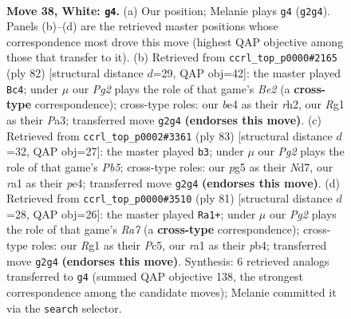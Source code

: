 \documentclass[11pt]{article}
\begin{document}
\clearpage

\begin{figure}[p]\centering
\begin{subfigure}{0.46\textwidth}\centering
\resizebox{\linewidth}{!}{%
\newchessgame
\chessboard[
  setfen={2k3n1/3n4/3b4/6p1/4b2p/7P/1p2K1P1/r5R1 w - - 2 38},
  showmover=false,
  pgfstyle=straightmove, color=movearrow, markmove={g2-g4}
]}
\caption{}
\end{subfigure}\hfill
\begin{subfigure}{0.46\textwidth}\centering
\resizebox{\linewidth}{!}{%
\newchessgame
\chessboard[
  setfen={5k2/5n2/4R3/p7/1p1p1P2/P7/1P2B2r/1K6 w - - 0 42},
  showmover=false,
  pgfstyle=straightmove, color=movearrow, markmove={e2-c4}
]}
\caption{}
\end{subfigure}
\\[4pt]
\begin{subfigure}{0.46\textwidth}\centering
\resizebox{\linewidth}{!}{%
\newchessgame
\chessboard[
  setfen={8/3n1p2/3k4/7R/1pr1P2p/3N1P2/3K2P1/8 b - - 0 42},
  showmover=false,
  pgfstyle=straightmove, color=movearrow, markmove={b4-b3}
]}
\caption{}
\end{subfigure}\hfill
\begin{subfigure}{0.46\textwidth}\centering
\resizebox{\linewidth}{!}{%
\newchessgame
\chessboard[
  setfen={2b5/p7/5k1p/2pB4/1P5P/2P1R3/r7/2K5 b - - 0 41},
  showmover=false,
  pgfstyle=straightmove, color=movearrow, markmove={a2-a1}
]}
\caption{}
\end{subfigure}
\caption{\textbf{Move 38, White: \texttt{g4}.} (a) Our position; Melanie plays \texttt{g4} (\texttt{g2g4}). Panels (b)--(d) are the retrieved master positions whose correspondence most drove this move (highest QAP objective among those that transfer to it). (b) Retrieved from \texttt{ccrl\_top\_p0000\#2165} (ply 82) [structural distance $d$=29, QAP obj=42]: the master played \texttt{Bc4}; under $\mu$ our \emph{Pg2} plays the role of that game's \emph{Be2} (a \textbf{cross-type} correspondence); cross-type roles: our \emph{b}e4 as their \emph{r}h2, our \emph{R}g1 as their \emph{P}a3; transferred move \texttt{g2g4} \textbf{(endorses this move)}. (c) Retrieved from \texttt{ccrl\_top\_p0002\#3361} (ply 83) [structural distance $d$=32, QAP obj=27]: the master played \texttt{b3}; under $\mu$ our \emph{Pg2} plays the role of that game's \emph{Pb5}; cross-type roles: our \emph{p}g5 as their \emph{N}d7, our \emph{r}a1 as their \emph{p}e4; transferred move \texttt{g2g4} \textbf{(endorses this move)}. (d) Retrieved from \texttt{ccrl\_top\_p0000\#3510} (ply 81) [structural distance $d$=28, QAP obj=26]: the master played \texttt{Ra1+}; under $\mu$ our \emph{Pg2} plays the role of that game's \emph{Ra7} (a \textbf{cross-type} correspondence); cross-type roles: our \emph{R}g1 as their \emph{P}c5, our \emph{r}a1 as their \emph{p}b4; transferred move \texttt{g2g4} \textbf{(endorses this move)}. Synthesis: 6 retrieved analogs transferred to \texttt{g4} (summed QAP objective 138, the strongest correspondence among the candidate moves); Melanie committed it via the \texttt{search} selector.}
\label{fig:thought-m74}
\end{figure}
\end{document}
